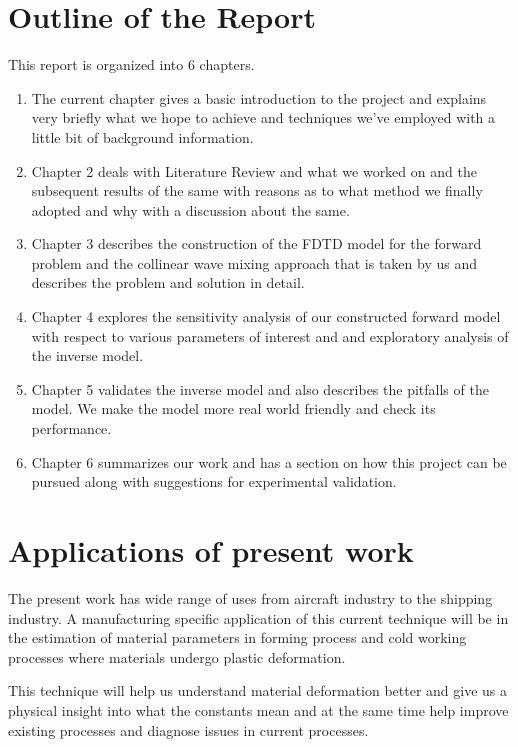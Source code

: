 \section{Outline of the Report}
This report is organized into 6 chapters.
\begin{enumerate}
\item The current chapter gives a basic introduction to the project and explains very briefly what we hope to achieve and techniques we've employed with a little bit of background information.

\item Chapter 2 deals with Literature Review and what we worked on and the subsequent results of the same with reasons as to what method we finally adopted and why with a discussion about the same.

\item Chapter 3 describes the construction of the FDTD model for the forward problem and the collinear wave mixing approach that is taken by us and describes the problem and solution in detail.

\item Chapter 4 explores the sensitivity analysis of our constructed forward model with respect to various parameters of interest and and exploratory analysis of the inverse model.

\item Chapter 5 validates the inverse model and also describes the pitfalls of the model. We make the model more real world friendly and check its performance.

\item Chapter 6 summarizes our work and has a section on how this project can be pursued along with suggestions for experimental validation.
\end{enumerate}
\section{Applications of present work}
The present work has wide range of uses from aircraft industry to the shipping industry. A manufacturing specific application of this current technique will be in the estimation of material parameters in forming process and cold working processes where materials undergo plastic deformation. 

This technique will help us understand material deformation better and give us a physical insight into what the constants mean and at the same time help improve existing processes and diagnose issues in current processes.  